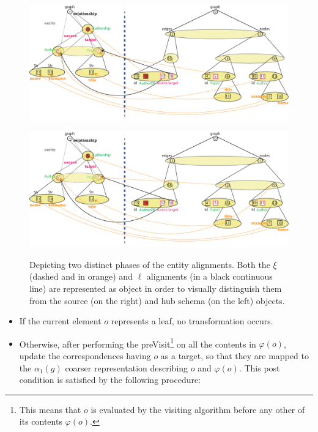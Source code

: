 \begin{example}[continues=ex:examplegraphdata,label=ex:examplereferencedOcaml]
\begin{figure}[!t]
	\centering
	\begin{minipage}{\textwidth}
		\centering
		\includegraphics[width=\textwidth]{fig/04model/04aAlignment}
		\label{subfig:match1}
	\end{minipage}
	\medskip
	
	\begin{minipage}{\textwidth}
		\centering
		\includegraphics[width=\textwidth]{fig/04model/04bAlignment}
		\label{subfig:match2}
	\end{minipage}
	\caption{Depicting two distinct phases of the entity alignments. Both the $\xi$  (dashed and in orange) and  $\ell$ alignments (in a black continuous line) are represented as object in order to visually distinguish them from the source (on the right) and hub  schema (on the left) objects.}
	\label{fig:alignmentrefinement}
\end{figure}
\begin{itemize}
	\item If the current element $o$ represents a leaf, no transformation occurs.
	\item Otherwise, after performing the preVisit\footnote{This means that $o$ is evaluated by the visiting algorithm before any other of its contents $\varphi(o)$.} on all the contents in $\varphi(o)$, update the  correspondences having $o$ as  a target, so that they are mapped to the $\alpha_1(g)$ coarser representation describing $o$ and $\varphi(o)$. This post condition is satisfied by the following procedure:
	\medskip
	

\end{itemize}
\end{example}
